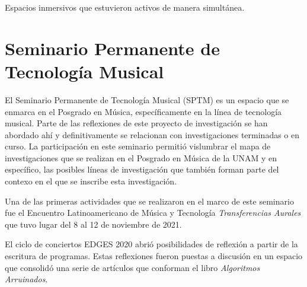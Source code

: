 
Espacios inmersivos que estuvieron activos de manera simultánea. 

\section{Seminario Permanente de Tecnología Musical} 

El Seminario Permanente de Tecnología Musical (SPTM) es un espacio que se enmarca en el Posgrado en Música, específicamente en la línea de tecnología musical. Parte de las reflexiones de este proyecto de investigación se han abordado ahí y definitivamente se relacionan con investigaciones terminadas o en curso. La participación en este seminario permitió vislumbrar el mapa de investigaciones que se realizan en el Posgrado en Música de la UNAM y en específico, las posibles líneas de investigación que también forman parte del contexo en el que se inscribe esta investigación.


Una de las primeras actividades que se realizaron en el marco de este seminario fue el Encuentro Latinoamericano de Música y Tecnología \textit{Transferencias Aurales} que tuvo lugar del 8 al 12 de noviembre de 2021.


El ciclo de conciertos EDGES 2020 abrió posibilidades de reflexión a partir de la escritura de programas. Estas reflexiones fueron puestas a discusión en un espacio que consolidó una serie de artículos que conforman el libro \textit{Algoritmos Arruinados}. 

